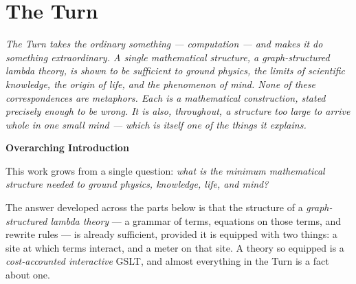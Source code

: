 \documentclass[12pt,openright,twoside]{book}
\theoremstyle{remark}
\theoremstyle{plain}
\theoremstyle{remark}
\theoremstyle{plain}
\theoremstyle{plain}
\begin{document}
\bigskip




\part{The Turn}

\vspace{1em}
\begin{mdframed}[backgroundcolor=remarkgray, linecolor=gray!60,
                 linewidth=1pt, topline=false, rightline=false,
                 bottomline=false]
\small\itshape
The Turn takes the ordinary something --- computation --- and makes it do
something extraordinary.
A single mathematical structure, a \emph{graph-structured lambda theory},
is shown to be sufficient to ground physics, the limits of scientific
knowledge, the origin of life, and the phenomenon of mind.
None of these correspondences are metaphors.
Each is a mathematical construction, stated precisely enough to be wrong.
It is also, throughout, a structure too large to arrive whole in one
small mind --- which is itself one of the things it explains.
\end{mdframed}

\bigskip



{}
{\large\bfseries\color{accentblue} Overarching Introduction}
\vspace{0.8em}

\noindent
This work grows from a single question: \emph{what is the minimum
mathematical structure needed to ground physics, knowledge, life, and
mind?}

The answer developed across the parts below is that the structure of a
\emph{graph-structured lambda theory} --- a grammar of terms, equations
on those terms, and rewrite rules --- is already sufficient, provided it
is equipped with two things: a site at which terms interact, and a meter
on that site.
A theory so equipped is a \emph{cost-accounted interactive} GSLT, and
almost everything in the Turn is a fact about one.
\end{document}
